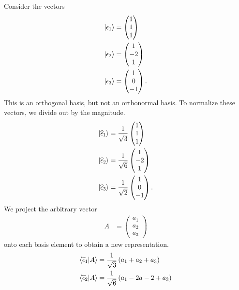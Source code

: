 \documentclass[10pt]{mypackage}
\newcommand{\ep}{\epsilon}
\begin{document}
\begin{example}
  Consider the vectors
  \begin{align*}
    \ket{\ep_1} &= \begin{pmatrix}1\\1\\1\end{pmatrix}\\
    \ket{\ep_2} &= \begin{pmatrix}1\\-2\\1\end{pmatrix}\\
    \ket{\ep_3} &= \begin{pmatrix}1\\0\\-1\end{pmatrix}.
  \end{align*}
  This is an orthogonal basis, but not an orthonormal basis. To normalize these vectors, we divide out by the magnitude.
  \begin{align*}
    \ket{\widehat{\ep}_{1}} &= \frac{1}{\sqrt{3}} \begin{pmatrix}1\\1\\1\end{pmatrix}\\
    \ket{\widehat{\ep}_{2}} &= \frac{1}{\sqrt{6}}\begin{pmatrix}1\\-2\\1\end{pmatrix}\\
    \ket{\widehat{\ep}_{3}} &= \frac{1}{\sqrt{2}} \begin{pmatrix}1\\0\\-1\end{pmatrix}.
  \end{align*}
  We project the arbitrary vector
  \begin{align*}
    A &= \begin{pmatrix}a_1\\a_2\\a_3\end{pmatrix}
  \end{align*}
  onto each basis element to obtain a new representation.
  \begin{align*}
    \braket{\widehat{\ep}_{1}}{A} &= \frac{1}{\sqrt{3}} \left(a_1 + a_2 + a_3\right)\\
    \braket{\widehat{\ep}_{2}}{A} &= \frac{1}{\sqrt{6}}\left(a_1 - 2a-2 + a_3\right)\\

\end{align*}
\end{example}
\end{document}
